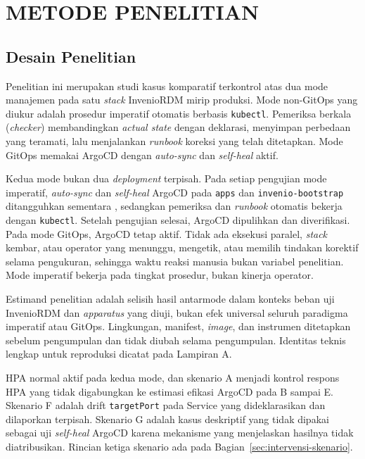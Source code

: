 \chapter{METODE PENELITIAN}

\section{Desain Penelitian}

Penelitian ini merupakan studi kasus komparatif terkontrol atas dua mode manajemen pada satu \textit{stack} InvenioRDM mirip produksi. Mode non-GitOps yang diukur adalah prosedur imperatif otomatis berbasis \texttt{kubectl}. Pemeriksa berkala (\textit{checker}) membandingkan \textit{actual state} dengan deklarasi, menyimpan perbedaan yang teramati, lalu menjalankan \textit{runbook} koreksi yang telah ditetapkan. Mode GitOps memakai ArgoCD dengan \textit{auto-sync} dan \textit{self-heal} aktif.

Kedua mode bukan dua \textit{deployment} terpisah. Pada setiap pengujian mode imperatif, \textit{auto-sync} dan \textit{self-heal} ArgoCD pada \texttt{apps} dan \texttt{invenio-bootstrap} ditangguhkan sementara \citep{argocd2025sync}, sedangkan pemeriksa dan \textit{runbook} otomatis bekerja dengan \texttt{kubectl}. Setelah pengujian selesai, ArgoCD dipulihkan dan diverifikasi. Pada mode GitOps, ArgoCD tetap aktif. Tidak ada eksekusi paralel, \textit{stack} kembar, atau operator yang menunggu, mengetik, atau memilih tindakan korektif selama pengukuran, sehingga waktu reaksi manusia bukan variabel penelitian. Mode imperatif bekerja pada tingkat prosedur, bukan kinerja operator.

Estimand penelitian adalah selisih hasil antarmode dalam konteks beban uji InvenioRDM dan \textit{apparatus} yang diuji, bukan efek universal seluruh paradigma imperatif atau GitOps. Lingkungan, manifest, \textit{image}, dan instrumen ditetapkan sebelum pengumpulan dan tidak diubah selama pengumpulan. Identitas teknis lengkap untuk reproduksi dicatat pada Lampiran A.

HPA normal aktif pada kedua mode, dan skenario A menjadi kontrol respons HPA yang tidak digabungkan ke estimasi efikasi ArgoCD pada B sampai E. Skenario F adalah drift \texttt{targetPort} pada Service yang dideklarasikan dan dilaporkan terpisah. Skenario G adalah kasus deskriptif yang tidak dipakai sebagai uji \textit{self-heal} ArgoCD karena mekanisme yang menjelaskan hasilnya tidak diatribusikan. Rincian ketiga skenario ada pada Bagian~\ref{sec:intervensi-skenario}.

